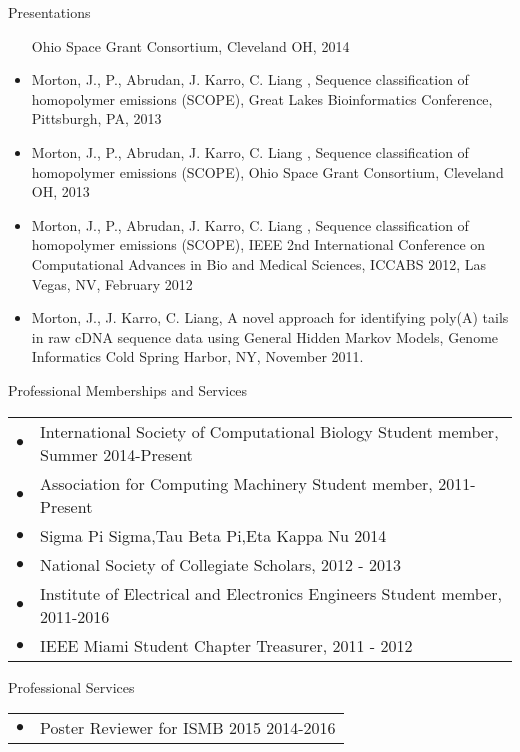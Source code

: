 \documentclass{resume} %
\begin{document}
\begin{rSection}{Presentations}
\begin{itemize}
                Ohio Space Grant Consortium, Cleveland OH, 2014
    \item   Morton, J., P., Abrudan, J. Karro, C. Liang , Sequence classification of homopolymer emissions
                (SCOPE), Great Lakes Bioinformatics Conference, Pittsburgh, PA, 2013
    \item   Morton, J., P., Abrudan, J. Karro, C. Liang , Sequence classification of homopolymer emissions
                (SCOPE), Ohio Space Grant Consortium, Cleveland OH, 2013
    \item   Morton, J., P., Abrudan, J. Karro, C. Liang , Sequence classification of homopolymer emissions
                (SCOPE), IEEE 2nd International Conference on Computational Advances in Bio and
                Medical Sciences, ICCABS 2012, Las Vegas, NV, February 2012
    \item   Morton, J., J. Karro, C. Liang, A novel approach for identifying poly(A) tails in
                raw cDNA sequence data using General Hidden Markov Models, Genome Informatics
                Cold Spring Harbor, NY, November 2011.
  \end{itemize}
\end{rSection}

\begin{rSection}{Professional Memberships and Services}
  \begin{tabular}{ll}
    $\bullet$ & International Society of Computational Biology Student member, Summer  2014-Present\\
    $\bullet$ & Association for Computing Machinery Student member, 2011-Present \\
    $\bullet$ & Sigma Pi Sigma,Tau Beta Pi,Eta Kappa Nu 2014 \\
    $\bullet$ & National Society of Collegiate Scholars, 2012 - 2013\\
    $\bullet$ & Institute of Electrical and Electronics Engineers Student member, 2011-2016 \\
    $\bullet$ & IEEE Miami Student Chapter Treasurer, 2011 - 2012\\
  \end{tabular}
\end{rSection}

\begin{rSection}{Professional Services}
  \begin{tabular}{ll}
    $\bullet$ & Poster Reviewer for ISMB 2015  2014-2016\\[10 mm]
  \end{tabular}
\end{rSection}
\end{document}
